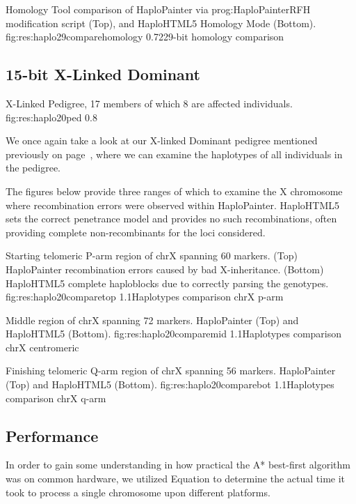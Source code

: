 {Homology Tool comparison of HaploPainter via \gls{prog:HaploPainterRFH} modification script (Top), and HaploHTML5 Homology Mode (Bottom).}
	{fig:res:haplo29comparehomology}
	{0.72}{29-bit homology comparison}

\subsection{15-bit X-Linked Dominant}

	{X-Linked Pedigree, 17 members of which 8 are affected individuals.}
	{fig:res:haplo20ped}
	{0.8}{}

We once again take a look at our X-linked Dominant pedigree mentioned previously on page~\pageref{fig:res:15summary}, where we can examine the haplotypes of all individuals in the pedigree.

The figures below provide three ranges of which to examine the X chromosome where recombination errors were observed within HaploPainter. HaploHTML5 sets the correct penetrance model and provides no such recombinations, often providing complete non-recombinants for the loci considered.


	{Starting telomeric P-arm region of chrX spanning 60 markers. (Top) HaploPainter recombination errors caused by bad X-inheritance. (Bottom) HaploHTML5 complete haploblocks due to correctly parsing the genotypes.}
	{fig:res:haplo20comparetop}
	{1.1}{Haplotypes comparison chrX p-arm}


	{Middle region of chrX spanning 72 markers. HaploPainter (Top) and HaploHTML5 (Bottom).}
	{fig:res:haplo20comparemid}
	{1.1}{Haplotypes comparison chrX centromeric}


	{Finishing telomeric Q-arm region of chrX spanning 56 markers. HaploPainter (Top) and HaploHTML5 (Bottom).}
	{fig:res:haplo20comparebot}
	{1.1}{Haplotypes comparison chrX q-arm}


\subsection{Performance}
\label{ref:res:jsperf}

In order to gain some understanding in how practical the A* best-first algorithm was on common hardware, we utilized Equation to determine the actual time it took to process a single chromosome upon different platforms.

